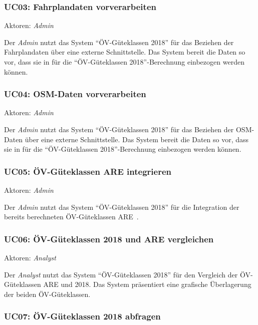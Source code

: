 \subsubsection{UC03: Fahrplandaten vorverarbeiten}
\label{Use Cases:UC03}

Aktoren: \emph{Admin}

Der \emph{Admin} nutzt das System "`\acs{ÖV}-Güteklassen 2018"' für das Beziehen der Fahrplandaten über eine externe Schnittstelle.
Das System bereit die Daten so vor, dass sie in  für die "`\acs{ÖV}-Güteklassen 2018"'-Berechnung einbezogen werden können.

\subsubsection{UC04: OSM-Daten vorverarbeiten}
\label{Use Cases:UC04}

Aktoren: \emph{Admin}

Der \emph{Admin} nutzt das System "`\acs{ÖV}-Güteklassen 2018"' für das Beziehen der \acs{OSM}-Daten über eine externe Schnittstelle.
Das System bereit die Daten so vor, dass sie in  für die "`\acs{ÖV}-Güteklassen 2018"'-Berechnung einbezogen werden können.


\subsubsection{UC05: ÖV-Güteklassen ARE integrieren}
\label{Use Cases:UC05}

Aktoren: \emph{Admin}

Der \emph{Admin} nutzt das System "`\acs{ÖV}-Güteklassen 2018"' für die Integration der bereits berechneten ÖV-Güteklassen ARE~\cite{berechnung_are}.


\subsubsection{UC06: ÖV-Güteklassen 2018 und ARE vergleichen}
\label{Use Cases:UC06}

Aktoren: \emph{Analyst}

Der \emph{Analyst} nutzt das System "`\acs{ÖV}-Güteklassen 2018"' für den Vergleich der \acs{ÖV}-Güteklassen ARE und 2018.
Das System präsentiert eine grafische Überlagerung der beiden \acs{ÖV}-Güteklassen.

\subsubsection{UC07: ÖV-Güteklassen 2018 abfragen}
\label{Use Cases:UC07}

